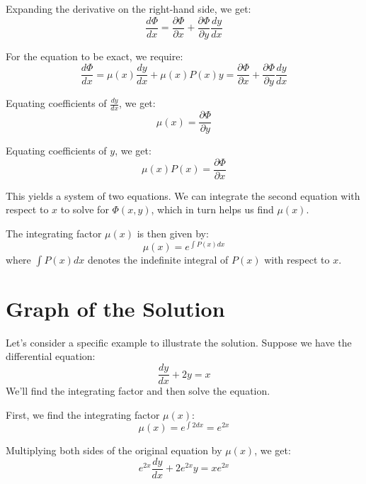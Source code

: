 \documentclass[a4paper,12pt]{article}
\begin{document}
Expanding the derivative on the right-hand side, we get:
\begin{equation}
    \frac{d\Phi}{dx} = \frac{\partial \Phi}{\partial x} + \frac{\partial \Phi}{\partial y} \frac{dy}{dx}
\end{equation}

For the equation to be exact, we require:
\begin{equation}
    \frac{d\Phi}{dx} = \mu(x) \frac{dy}{dx} + \mu(x) P(x) y = \frac{\partial \Phi}{\partial x} + \frac{\partial \Phi}{\partial y} \frac{dy}{dx}
\end{equation}

Equating coefficients of \( \frac{dy}{dx} \), we get:
\begin{equation}
    \mu(x) = \frac{\partial \Phi}{\partial y}
\end{equation}

Equating coefficients of \( y \), we get:
\begin{equation}
    \mu(x) P(x) = \frac{\partial \Phi}{\partial x}
\end{equation}

This yields a system of two equations. We can integrate the second equation with respect to \( x \) to solve for \( \Phi(x, y) \), which in turn helps us find \( \mu(x) \). 

The integrating factor \( \mu(x) \) is then given by:
\begin{equation}
    \mu(x) = e^{\int P(x) dx}
\end{equation}
where \( \int P(x) dx \) denotes the indefinite integral of \( P(x) \) with respect to \( x \).

\section{Graph of the Solution}
Let's consider a specific example to illustrate the solution. Suppose we have the differential equation:
\begin{equation}
    \frac{dy}{dx} + 2y = x
\end{equation}
We'll find the integrating factor and then solve the equation.

First, we find the integrating factor \( \mu(x) \):
\begin{equation}
    \mu(x) = e^{\int 2 dx} = e^{2x}
\end{equation}

Multiplying both sides of the original equation by \( \mu(x) \), we get:
\begin{equation}
    e^{2x} \frac{dy}{dx} + 2e^{2x}y = xe^{2x}
\end{equation}
\end{document}
